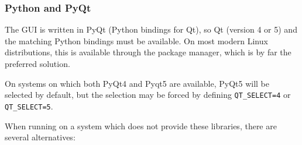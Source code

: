 \documentclass[a4paper,10pt,twoside]{csshortdoc}
\begin{document}
\subsubsection{Python and PyQt\label{sec:ext:python}}

The GUI is written in PyQt (Python bindings for Qt), so Qt (version 4 or 5)
and the matching Python bindings must be available. On most modern
Linux distributions, this is available through the package manager,
which is by far the preferred solution.

On systems on which both PyQt4 and Pyqt5 are available, PyQt5 will be selected
by default, but the selection may be forced by defining
\texttt{QT\_SELECT=4} or \texttt{QT\_SELECT=5}.

When running on a system which does
not provide these libraries, there are several alternatives:
\end{document}
